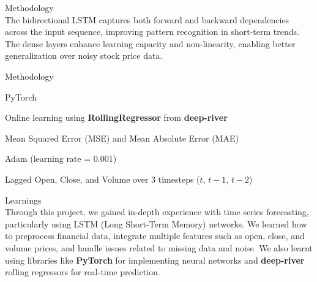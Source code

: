 \documentclass[9pt]{beamer}
\begin{document}
\begin{frame}{Methodology}
    \\[0.3cm]

    The bidirectional LSTM captures both forward and backward dependencies
    across
    the input sequence, improving pattern recognition in short-term trends. The
    dense layers enhance learning capacity and non-linearity, enabling better
    generalization over noisy stock price data.

\end{frame}

\begin{frame}{Methodology}
    \\[0.8cm]
    \begin{description}[leftmargin=3.5cm, style=nextline]
        \item[Framework:] PyTorch
        \item[Training Strategy:] Online learning using
            \textbf{RollingRegressor}
            from \textbf{deep-river}
        \item[Loss Function:] Mean Squared Error (MSE) and Mean Absolute Error
            (MAE)
        \item[Optimizer:] Adam (learning rate = 0.001)
        \item[Features:] Lagged Open, Close, and Volume over 3 timesteps ($t$,
            $t-1$, $t-2$)
    \end{description}

\end{frame}


\begin{frame}{Learnings}
    \\[0.3cm]
    Through this project, we gained in-depth experience with time series forecasting, particularly using LSTM (Long Short-Term Memory) networks. We learned how to preprocess financial data, integrate multiple features such as open, close, and volume prices, and handle issues related to missing data and noise. We also learnt using libraries like \textbf{PyTorch} for implementing neural networks and \textbf{deep-river} rolling regressors for real-time prediction.
\end{frame}
\end{document}
